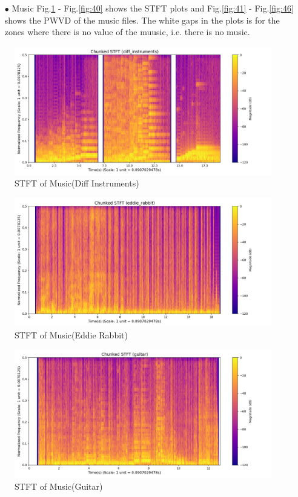 \documentclass[12pt,a4paper,onecolumn]{exam}
\begin{document}
\begin{solution}
  \begin{itemize}
    \item[$\bullet$] Music Fig.\ref{fig:35} - Fig.\ref{fig:40} shows the STFT plots and Fig.\ref{fig:41} - Fig.\ref{fig:46} shows the PWVD of the music files. The white gaps in the plots is for the zones where there is no value of the muusic, i.e. there is no music. 
  \end{itemize}
        \begin{figure}[H]
        \centering
        \includegraphics[scale = 0.45]{music_diff_instruments_stft.png}
        \caption{STFT of Music(Diff Instruments)}
        \label{fig:35}
        \end{figure}

        \begin{figure}[H]
        \centering
        \includegraphics[scale = 0.45]{music_eddie_rabbit_stft.png}
        \caption{STFT of Music(Eddie Rabbit)}
        \label{fig:36}
        \end{figure}

        \begin{figure}[H]
        \centering
        \includegraphics[scale = 0.45]{music_guitar_stft.png}
        \caption{STFT of Music(Guitar)}
        \label{fig:37}
        \end{figure}


\end{solution}
\end{document}
